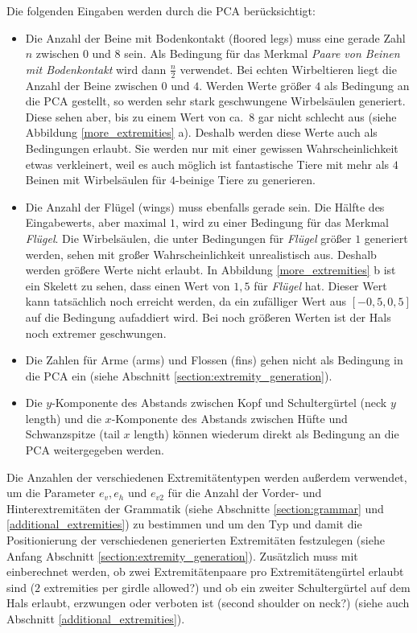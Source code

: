 Die folgenden Eingaben werden durch die PCA berücksichtigt:
\begin{itemize}
 \item Die Anzahl der Beine mit Bodenkontakt (floored legs) muss eine gerade Zahl $n$ zwischen $0$ und $8$ sein. Als Bedingung für das Merkmal \emph{Paare von Beinen mit Bodenkontakt} wird dann $\frac{n}{2}$ verwendet. Bei echten Wirbeltieren liegt die Anzahl der Beine zwischen $0$ und $4$. Werden Werte größer $4$ als Bedingung an die PCA gestellt, so werden sehr stark geschwungene Wirbelsäulen generiert. Diese sehen aber, bis zu einem Wert von ca.\ $8$ gar nicht schlecht aus (siehe Abbildung \ref{more_extremities} a). Deshalb werden diese Werte auch als Bedingungen erlaubt. Sie werden nur mit einer gewissen Wahrscheinlichkeit etwas verkleinert, weil es auch möglich ist fantastische Tiere mit mehr als $4$ Beinen mit Wirbelsäulen für $4$-beinige Tiere zu generieren.
 
 \item Die Anzahl der Flügel (wings) muss ebenfalls gerade sein. Die Hälfte des Eingabewerts, aber maximal $1$, wird zu einer Bedingung für das Merkmal \emph{Flügel}.
 Die Wirbelsäulen, die unter Bedingungen für \emph{Flügel} größer $1$ generiert werden, sehen mit großer Wahrscheinlichkeit unrealistisch aus. Deshalb werden größere Werte nicht erlaubt. In Abbildung \ref{more_extremities} b ist ein Skelett zu sehen, dass einen Wert von $1{,}5$ für \emph{Flügel} hat. Dieser Wert kann tatsächlich noch erreicht werden, da ein zufälliger Wert aus $[-0{,}5, 0{,}5]$ auf die Bedingung aufaddiert wird. Bei noch größeren Werten ist der Hals noch extremer geschwungen.
 
 \item Die Zahlen für Arme (arms) und Flossen (fins) gehen nicht als Bedingung in die PCA ein (siehe Abschnitt \ref{section:extremity_generation}).
 
 \item Die $y$-Komponente des Abstands zwischen Kopf und Schultergürtel (neck $y$ length) und die $x$-Komponente des Abstands zwischen Hüfte und Schwanzspitze (tail $x$ length) können wiederum direkt als Bedingung an die PCA weitergegeben werden.
\end{itemize}

Die Anzahlen der verschiedenen Extremitätentypen werden außerdem verwendet, um die Parameter $e_v, e_h$ und $e_{v2}$ für die Anzahl der Vorder- und Hinterextremitäten der Grammatik (siehe Abschnitte \ref{section:grammar} und \ref{additional_extremities}) zu bestimmen und um den Typ und damit die Positionierung der verschiedenen generierten Extremitäten festzulegen (siehe Anfang Abschnitt \ref{section:extremity_generation}). Zusätzlich muss mit einberechnet werden, ob zwei Extremitätenpaare pro Extremitätengürtel erlaubt sind ($2$ extremities per girdle allowed?) und ob ein zweiter Schultergürtel auf dem Hals erlaubt, erzwungen oder verboten ist (second shoulder on neck?) (siehe auch Abschnitt \ref{additional_extremities}).

